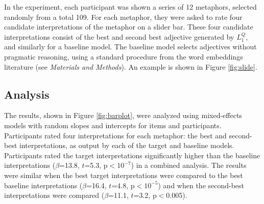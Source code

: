 \documentclass[9pt,twocolumn,twoside,lineno]{pnas-new}
\newcommand{\Listener}{L}
\newcommand{\QLONE}{\Listener_{{1}}^{{Q}}}
\begin{document}
		In the experiment, each participant was shown a series of 12 metaphors, selected randomly from a total 109. For each metaphor, they were asked to rate four candidate interpretations of the metaphor on a slider bar. These four candidate interpretations consist of the best and second best adjective generated by $\QLONE$, and similarly for a baseline model. The baseline model selects adjectives without pragmatic reasoning, using a standard procedure from the word embeddings literature (see \emph{Materials and Methods}). An example is shown in Figure \ref{fig:slide}.


	
	

	\subsection*{Analysis}

		The results, shown in Figure \ref{fig:barplot}, were analyzed using mixed-effects models with random slopes and intercepts for items and participants. Participants rated four interpretations for each metaphor: the best and second-best interpretations, as output by each of the target and baseline models. Participants rated the target interpretations significantly higher than the baseline interpretations ($\beta$=13.8, $t$=5.3, p$<10^{-7}$) in a combined analysis. The results were similar when the best target interpretations were compared to the best baseline interpretations ($\beta$=16.4, $t$=4.8, p$<10^{-5}$) and when the second-best interpretations were compared ($\beta$=11.1, $t$=3.2, p$<$0.005).



		

\end{document}
